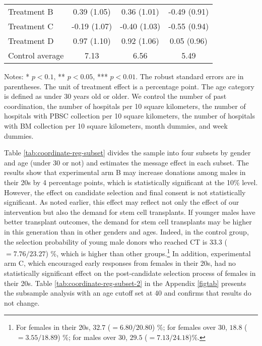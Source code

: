 \documentclass[12pt, a4paper]{article}
\begin{document}
\begin{table}
\begin{threeparttable}
\begin{tabular}[t]{lccc}
\hspace{1em}Treatment B & 0.39 (1.05) & 0.36 (1.01) & -0.49 (0.91)\\
\hspace{1em}Treatment C & -0.19 (1.07) & -0.40 (1.03) & -0.55 (0.94)\\
\hspace{1em}Treatment D & 0.97 (1.10) & 0.92 (1.06) & 0.05 (0.96)\\
\hspace{1em}Control average & 7.13 & 6.56 & 5.49\\
\bottomrule
\end{tabular}
\begin{tablenotes}
\item Notes: * $p < 0.1$, ** $p < 0.05$, *** $p < 0.01$. The robust standard errors are in parentheses. The unit of treatment effect is a percentage point. The age category is defined as under 30 years old or older. We control the number of past coordination, the number of hospitals per 10 square kilometers, the number of hospitals with PBSC collection per 10 square kilometers, the number of hospitals with BM collection per 10 square kilometers, month dummies, and week dummies.
\end{tablenotes}
\end{threeparttable}
\end{table}

Table \ref{tab:coordinate-reg-subset} divides the sample into four subsets by gender and age (under 30 or not) and estimates the message effect in each subset. The results show that experimental arm B may increase donations among males in their 20s by 4 percentage points, which is statistically significant at the 10\% level. However, the effect on candidate selection and final consent is not statistically significant. As noted earlier, this effect may reflect not only the effect of our intervention but also the demand for stem cell transplants. If younger males have better transplant outcomes, the demand for stem cell transplants may be higher in this generation than in other genders and ages. Indeed, in the control group, the selection probability of young male donors who reached CT is \(33.3\) (\(=7.76/23.27\)) \%, which is higher than other groups.\footnote{For females in their 20s, \(32.7\) (\(=6.80 / 20.80\)) \%; for females over 30, \(18.8\) (\(=3.55 / 18.89\)) \%; for males over 30, \(29.5\) (\(=7.13/24.18\))\%.} In addition, experimental arm C, which encouraged early responses from females in their 20s, had no statistically significant effect on the post-candidate selection process of females in their 20s. Table \ref{tab:coordinate-reg-subset-2} in the Appendix \ref{figtab} presents the subsample analysis with an age cutoff set at 40 and confirms that results do not change.
\end{document}
